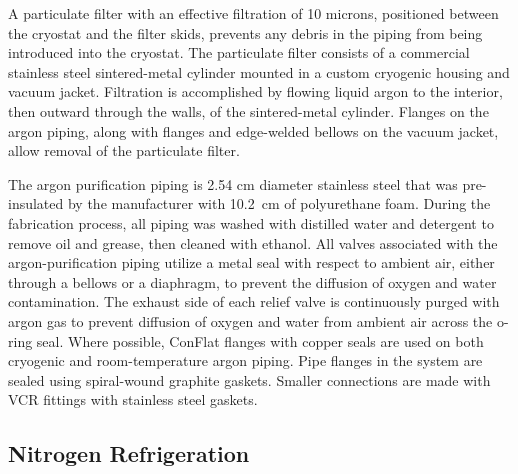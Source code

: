 A particulate filter with an effective filtration of 10 microns, positioned between the cryostat and the filter skids, prevents any debris in the piping from being introduced into the cryostat.  The particulate filter consists of a commercial stainless steel sintered-metal cylinder mounted in a custom cryogenic housing and vacuum jacket.  Filtration is accomplished by flowing liquid argon to the interior, then outward through the walls, of the sintered-metal cylinder.  Flanges on the argon piping, along with flanges and edge-welded bellows on the vacuum jacket, allow removal of the particulate filter.  




The argon purification piping is 2.54 cm diameter stainless steel that was pre-insulated by the manufacturer with 10.2~cm of polyurethane foam.  During the fabrication process, all piping was washed with distilled water and detergent to remove oil and grease, then cleaned with ethanol.  All valves associated with the argon-purification piping utilize a metal seal with respect to ambient air, either through a bellows or a diaphragm, to prevent the diffusion of oxygen and water contamination.  The exhaust side of each relief valve is continuously purged with argon gas to prevent diffusion of oxygen and water from ambient air across the o-ring seal.  Where possible, ConFlat flanges with copper seals are used on both cryogenic and room-temperature argon piping.  Pipe flanges in the system are sealed using spiral-wound graphite gaskets.  Smaller connections are made with VCR fittings with stainless steel gaskets.  

\subsection{Nitrogen Refrigeration}

